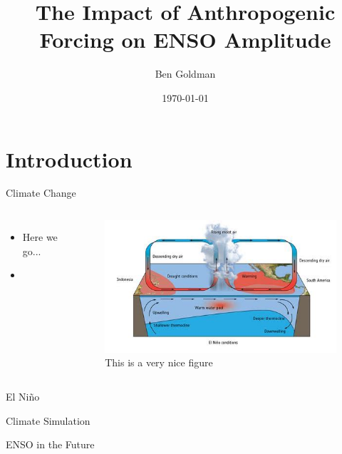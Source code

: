 \message{ !name(presentation.tex)}\documentclass{beamer}
\title{The Impact of Anthropogenic Forcing on ENSO Amplitude}
\author{Ben Goldman}
\date{\today}
\begin{document}


\maketitle

\section{Introduction}

\begin{frame}{Climate Change}

  \begin{columns}
    \begin{itemize}
    \item Here we go...
    \item \cite{bjerknes1969atmospheric}
    \end{itemize}
    \begin{figure}
      \centering
      \includegraphics[width=\textwidth]{figures/example.jpg}
      \caption{This is a very nice figure}
      \label{fig:this}
    \end{figure}
  \end{columns}
\end{frame}

\begin{frame}{El Niño}

\end{frame}

\begin{frame}{Climate Simulation}

\end{frame}

\begin{frame}{ENSO in the Future}

\end{frame}
\end{document}
